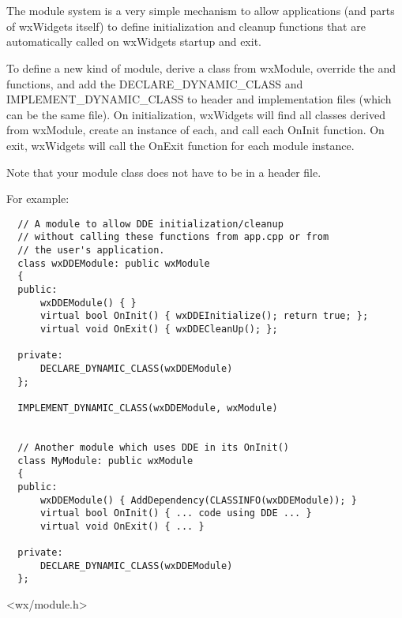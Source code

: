 \section{}\label{wxmodule}

The module system is a very simple mechanism to allow applications (and parts
of wxWidgets itself) to define initialization and cleanup functions that are
automatically called on wxWidgets startup and exit.

To define a new kind of module, derive a class from wxModule, override the
 and  
functions, and add the DECLARE\_DYNAMIC\_CLASS and IMPLEMENT\_DYNAMIC\_CLASS to
header and implementation files (which can be the same file). On
initialization, wxWidgets will find all classes derived from wxModule, create
an instance of each, and call each OnInit function. On exit, wxWidgets will
call the OnExit function for each module instance.

Note that your module class does not have to be in a header file.

For example:

\begin{verbatim}
  // A module to allow DDE initialization/cleanup
  // without calling these functions from app.cpp or from
  // the user's application.
  class wxDDEModule: public wxModule
  {
  public:
      wxDDEModule() { }
      virtual bool OnInit() { wxDDEInitialize(); return true; };
      virtual void OnExit() { wxDDECleanUp(); };

  private:
      DECLARE_DYNAMIC_CLASS(wxDDEModule)
  };

  IMPLEMENT_DYNAMIC_CLASS(wxDDEModule, wxModule)


  // Another module which uses DDE in its OnInit()
  class MyModule: public wxModule
  {
  public:
      wxDDEModule() { AddDependency(CLASSINFO(wxDDEModule)); }
      virtual bool OnInit() { ... code using DDE ... }
      virtual void OnExit() { ... }

  private:
      DECLARE_DYNAMIC_CLASS(wxDDEModule)
  };
\end{verbatim}




<wx/module.h>



